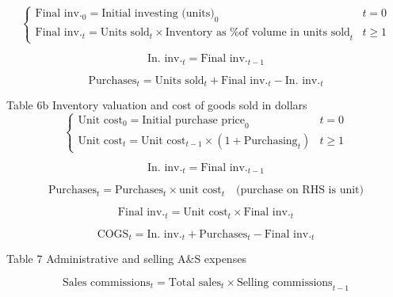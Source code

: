 \documentclass[12pt]{article}
\numberwithin{equation}{section}
\begin{document}
\begin{equation}
	\begin{cases}
		\text{Final inv.}_{0} = \text{Initial investing (units)}_{0} & t=0 \\
		\text{Final inv.}_{t} = \text{Units sold}_{t} \times \text{Inventory as \% of volume in units sold}_{t}&t \geq 1
	\end{cases}
\end{equation}

\begin{equation}
	\text{In. inv.}_{t} = \text{Final inv.}_{t-1}
\end{equation}

\begin{equation}
	\text{Purchases}_{t} = \text{Units sold}_{t} + \text{Final inv.}_{t} - \text{In. inv.}_{t}
\end{equation}

Table 6b Inventory valuation and cost of goods sold in dollars
\begin{equation}
	\begin{cases}
		\text{Unit cost}_{0} = \text{Initial purchase price}_{0} & t=0\\
		\text{Unit cost}_{t} = \text{Unit cost}_{t-1} \times (1+\text{Purchasing}_{t})&t \geq 1
	\end{cases}
\end{equation}

\begin{equation}
	\text{In. inv.}_{t} = \text{Final inv.}_{t-1}
\end{equation}

\begin{equation}
	\text{Purchases}_{t} = \text{Purchases}_{t} \times \text{unit cost}_{t} \quad \text{(purchase on RHS is unit)}
\end{equation}

\begin{equation}
	\text{Final inv.}_{t} = \text{Unit cost}_{t} \times \text{Final inv.}_{t}
\end{equation}

\begin{equation}
	\text{COGS}_{t} = \text{In. inv.}_{t} + \text{Purchases}_{t} - \text{Final inv.}_{t}
\end{equation}

Table 7 Administrative and selling A\&S expenses

\begin{equation}
	\text{Sales commissions}_{t} = \text{Total sales}_{t} \times \text{Selling commissions}_{t-1}
\end{equation}
\end{document}
